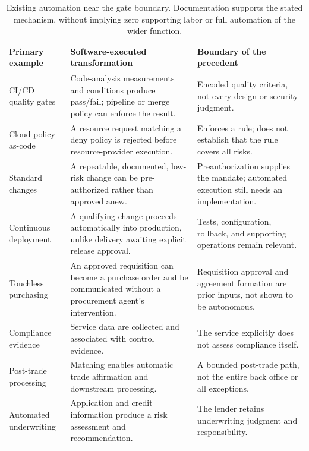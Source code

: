 \begin{table}[!htb]
\centering\small
\caption{Existing automation near the gate boundary. Documentation supports the stated mechanism,
without implying zero supporting labor or full automation of the wider function.}
\label{tab:precedents}
\begin{tabularx}{\linewidth}{@{}P{3.3cm}LL@{}}
\toprule
Primary example & Software-executed transformation & Boundary of the precedent\\
\midrule
CI/CD quality gates \citep{sonar2026} & Code-analysis measurements and conditions produce pass/fail;
pipeline or merge policy can enforce the result. & Encoded quality criteria, not every design or
security judgment.\\
Cloud policy-as-code \citep{mspolicy2025} & A resource request matching a deny policy is rejected
before resource-provider execution. & Enforces a rule; does not establish that the rule covers all
risks.\\
Standard changes \citep{atlassian2026} & A repeatable, documented, low-risk change can be
pre-authorized rather than approved anew. & Preauthorization supplies the mandate; automated execution
still needs an implementation.\\
Continuous deployment \citep{awscd2026} & A qualifying change proceeds automatically into production,
unlike delivery awaiting explicit release approval. & Tests, configuration, rollback, and supporting
operations remain relevant.\\
Touchless purchasing \citep{oracle2026} & An approved requisition can become a purchase order and be
communicated without a procurement agent's intervention. & Requisition approval and agreement formation
are prior inputs, not shown to be autonomous.\\
Compliance evidence \citep{awsaudit2026} & Service data are collected and associated with control
evidence. & The service explicitly does not assess compliance itself.\\
Post-trade processing \citep{dtcc2026} & Matching enables automatic trade affirmation and downstream
processing. & A bounded post-trade path, not the entire back office or all exceptions.\\
Automated underwriting \citep{fanniemae2026} & Application and credit information produce a risk
assessment and recommendation. & The lender retains underwriting judgment and responsibility.\\
\bottomrule
\end{tabularx}
\end{table}

